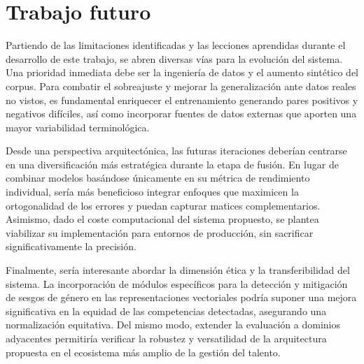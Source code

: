 \section{Trabajo futuro}
\label{sec:Trab_Fut}

\noindent Partiendo de las limitaciones identificadas y las lecciones aprendidas durante el desarrollo de este trabajo, se abren diversas vías para la evolución del sistema. Una prioridad inmediata debe ser la ingeniería de datos y el aumento sintético del corpus. Para combatir el sobreajuste y mejorar la generalización ante datos reales no vistos, es fundamental enriquecer el entrenamiento generando pares positivos y negativos difíciles, así como incorporar fuentes de datos externas que aporten una mayor variabilidad terminológica.%

Desde una perspectiva arquitectónica, las futuras iteraciones deberían centrarse en una diversificación más estratégica durante la etapa de fusión. En lugar de combinar modelos basándose únicamente en su métrica de rendimiento individual, sería más beneficioso integrar enfoques que maximicen la ortogonalidad de los errores y puedan capturar matices complementarios. Asimismo, dado el coste computacional del sistema propuesto, se plantea viabilizar su implementación para entornos de producción, sin sacrificar significativamente la precisión.

Finalmente, sería interesante abordar la dimensión ética y la transferibilidad del sistema. La incorporación de módulos específicos para la detección y mitigación de sesgos de género en las representaciones vectoriales podría suponer una mejora significativa en la equidad de las competencias detectadas, asegurando una normalización equitativa. Del mismo modo, extender la evaluación a dominios adyacentes permitiría verificar la robustez y versatilidad de la arquitectura propuesta en el ecosistema más amplio de la gestión del talento.%